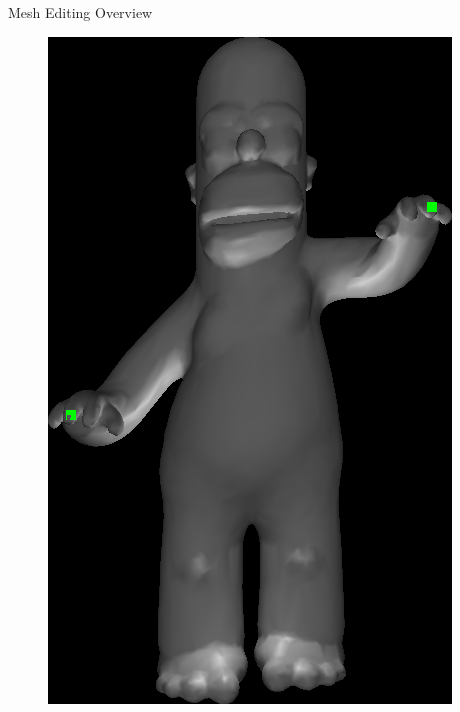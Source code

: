 \documentclass{beamer}
\begin{document}
\begin{frame}{Mesh Editing Overview}
\begin{figure}
{\begin{minipage}{0.36\textwidth}
    \includegraphics[width=\textwidth]{HomerLaplacian.png}
\end{minipage}
}
\end{figure}


\end{frame}
\end{document}
